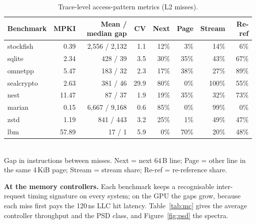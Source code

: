 \documentclass[12pt]{article}
\begin{document}
\begin{table}[htbp]
\centering
\caption{Trace-level access-pattern metrics (L2 misses).}
\label{tab:pattern}
\small
\begin{tabular}{@{}lrrrrrrr@{}}
\toprule
Benchmark & MPKI & Mean / median gap & CV & Next & Page & Stream & Re-ref\\
\midrule
stockfish & 0.39 & 2,556 / 2,132 & 1.1 & 12\% & 3\% & 14\% & 6\%\\
sqlite & 2.34 & 428 / 39 & 3.5 & 30\% & 35\% & 43\% & 67\%\\
omnetpp & 5.47 & 183 / 32 & 2.3 & 17\% & 38\% & 27\% & 89\%\\
sealcrypto & 2.63 & 381 / 46 & 29.9 & 80\% & 0\% & 100\% & 55\%\\
nest & 11.47 & 87 / 37 & 1.9 & 19\% & 35\% & 32\% & 73\%\\
marian & 0.15 & 6,667 / 9,168 & 0.6 & 85\% & 0\% & 99\% & 0\%\\
zstd & 1.19 & 841 / 443 & 3.2 & 25\% & 1\% & 49\% & 47\%\\
lbm & 57.89 & 17 / 1 & 5.9 & 0\% & 70\% & 20\% & 48\%\\
\bottomrule
\end{tabular}\\[2pt]
{\footnotesize Gap in instructions between misses. Next = next 64\,B line; Page = other line in the same 4\,KiB page; Stream = stream share; Re-ref = re-reference share.}
\end{table}

\textbf{At the memory controllers.} Each benchmark keeps a recognisable inter-request timing signature on every system; on the GPU the gaps grow, because each miss first pays the 120\,ns LLC hit latency. Table~\ref{tab:mc} gives the average controller throughput and the PSD class, and Figure~\ref{fig:psd} the spectra.
\end{document}
